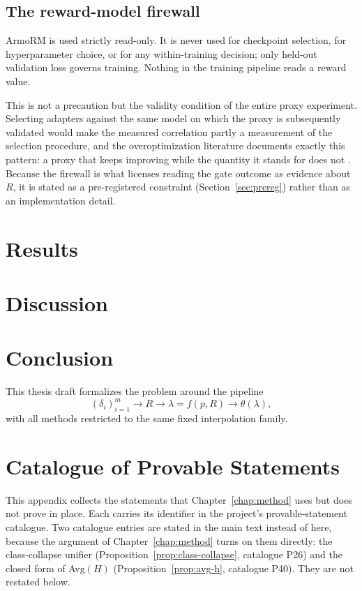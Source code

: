 \documentclass[12pt,a4paper]{report}
\newcommand{\1}{\mathbf{1}}
\theoremstyle{definition}
\begin{document}
\section{The reward-model firewall}
\label{sec:firewall}

ArmoRM is used strictly read-only. It is never used for checkpoint selection, for hyperparameter choice, or for any within-training decision; only held-out validation loss governs training. Nothing in the training pipeline reads a reward value.

This is not a precaution but the validity condition of the entire proxy experiment. Selecting adapters against the same model on which the proxy is subsequently validated would make the measured correlation partly a measurement of the selection procedure, and the overoptimization literature documents exactly this pattern: a proxy that keeps improving while the quantity it stands for does not \citep{gao2023overoptimization}. Because the firewall is what licenses reading the gate outcome as evidence about \(R\), it is stated as a pre-registered constraint (Section~\ref{sec:prereg}) rather than as an implementation detail.

\chapter{Results}
\label{chap:results}

\chapter{Discussion}

\chapter{Conclusion}

This thesis draft formalizes the problem around the pipeline
\[
(\delta_i)_{i=1}^m \longrightarrow R \longrightarrow \lambda=f(p,R) \longrightarrow \theta(\lambda),
\]
with all methods restricted to the same fixed interpolation family.

\appendix

\chapter{Catalogue of Provable Statements}
\label{app:catalogue}

This appendix collects the statements that Chapter~\ref{chap:method} uses but does not prove in place. Each carries its identifier in the project's provable-statement catalogue. Two catalogue entries are stated in the main text instead of here, because the argument of Chapter~\ref{chap:method} turns on them directly: the class-collapse unifier (Proposition~\ref{prop:class-collapse}, catalogue P26) and the closed form of Avg\((H)\) (Proposition~\ref{prop:avg-h}, catalogue P40). They are not restated below.
\end{document}
